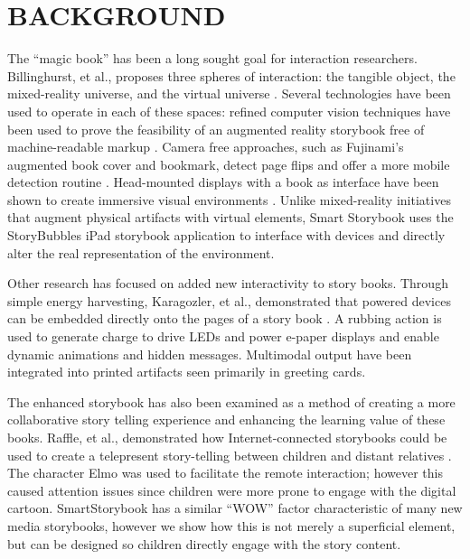 \documentclass{sigchi}
\begin{document}
\section{BACKGROUND}
The ``magic book'' has been a long sought goal for interaction researchers.
Billinghurst, et al., proposes three spheres of interaction: the tangible object, the mixed-reality universe, and the virtual universe \cite{billinghurst_magicbook-moving_2001}. Several technologies have been used to operate in each of these spaces: refined computer vision techniques have been used to prove the feasibility of an augmented reality storybook free of machine-readable markup \cite{scherrer_haunted_2008}. Camera free approaches, such as Fujinami's augmented book cover and bookmark, detect page flips and offer a more mobile detection routine \cite{fujinami_page-flipping_2009}. Head-mounted displays with a book as interface have been shown to create immersive visual environments \cite{saso_little_2003}. Unlike mixed-reality initiatives that augment physical artifacts with virtual elements, Smart Storybook uses the StoryBubbles iPad storybook application to interface with devices and directly alter the real representation of the environment.

Other research has focused on added new interactivity to story books. 
Through simple energy harvesting, Karagozler, et al., demonstrated that powered devices can be embedded directly onto the pages of a story book \cite{karagozler_paper_2013}. A rubbing action is used to generate charge to drive LEDs and power e-paper displays and enable dynamic animations and hidden messages. 
Multimodal output have been integrated into printed artifacts \cite{iggulden_printed_1999} seen primarily in greeting cards. 

The enhanced storybook has also been examined as a method of creating a more collaborative story telling experience and enhancing the learning value of these books. Raffle, et al., demonstrated how Internet-connected storybooks could be used to create a telepresent story-telling between children and distant relatives \cite{raffle_family_2010}. The character Elmo was used to facilitate the remote interaction; however this caused attention issues since children were more prone to engage with the digital cartoon. SmartStorybook has a similar ``WOW'' factor characteristic of many new media storybooks, however we show how this is not merely a superficial element, but can be designed so children directly engage with the story content. 


\end{document}
